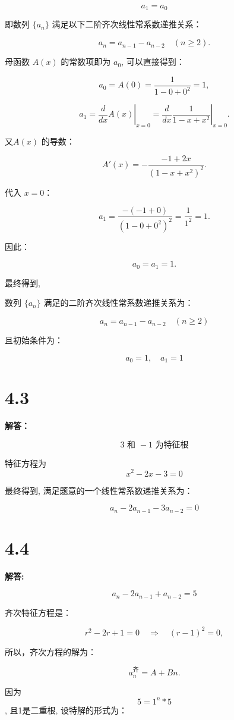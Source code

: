 \documentclass{article}
\begin{document}
\[a_1 = a_0
\]

即数列 $\{a_n\}$ 满足以下二阶齐次线性常系数递推关系：

\[
a_n = a_{n-1} - a_{n-2} \quad (n \geq 2).
\]

母函数 $A(x)$ 的常数项即为 $a_0$, 可以直接得到：

\[
a_0 = A(0) = \frac{1}{1 - 0 + 0^2} = 1,
\]

\[
a_1 = \left. \frac{d}{dx} A(x) \right|_{x=0} = \left. \frac{d}{dx} \frac{1}{1 - x + x^2} \right|_{x=0}.
\]

又$A(x)$ 的导数：

\[
A'(x) = - \frac{-1 + 2x}{(1 - x + x^2)^2}.
\]

代入 $x = 0$：

\[
a_1 = \frac{-(-1 + 0)}{(1 - 0 + 0^2)^2} = \frac{1}{1^2} = 1.
\]

因此：

\[
a_0 = a_1 = 1.
\]

最终得到,

数列 $\{a_n\}$ 满足的二阶齐次线性常系数递推关系为：

\[
\boxed{a_n = a_{n-1} - a_{n-2} \quad (n \geq 2)}
\]

且初始条件为：

\[
\boxed{a_0 = 1, \quad a_1 = 1}
\]

\section*{4.3}
\textbf{解答：}


\[
 3 \text{ 和 } -1 \text{ 为特征根}
\]

特征方程为
\[
x^2 - 2x - 3 = 0
\]

最终得到, 满足题意的一个线性常系数递推关系为：

\[
\boxed{a_n - 2a_{n-1} - 3a_{n-2} = 0}
\]

\section*{4.4}
\textbf{解答:}

\[
a_n - 2a_{n-1} + a_{n-2} = 5
\]

齐次特征方程是：

\[
r^2 - 2r + 1 = 0 \quad \Rightarrow \quad (r - 1)^2 = 0,
\]

所以，齐次方程的解为：

\[
a_n^{\text{齐}} = A + Bn.
\]


因为\[5 = 1^n * 5\], 且1是二重根, 设特解的形式为：
\end{document}
